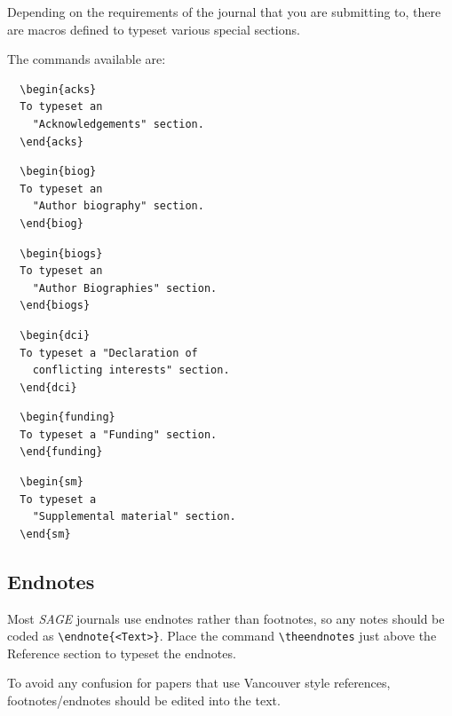 \documentclass[Afour,sageh,times]{includes/tex/sagej}
\begin{document}
Depending on the requirements of the journal that you are submitting to,
there are macros defined to typeset various special sections.

The commands available are:

\begin{verbatim}
  \begin{acks}
  To typeset an
    "Acknowledgements" section.
  \end{acks}
\end{verbatim}

\begin{verbatim}
  \begin{biog}
  To typeset an
    "Author biography" section.
  \end{biog}
\end{verbatim}

\begin{verbatim}
  \begin{biogs}
  To typeset an
    "Author Biographies" section.
  \end{biogs}
\end{verbatim}

\begin{verbatim}
  \begin{dci}
  To typeset a "Declaration of
    conflicting interests" section.
  \end{dci}
\end{verbatim}

\begin{verbatim}
  \begin{funding}
  To typeset a "Funding" section.
  \end{funding}
\end{verbatim}

\begin{verbatim}
  \begin{sm}
  To typeset a
    "Supplemental material" section.
  \end{sm}
\end{verbatim}

\subsection{Endnotes}

Most \textit{SAGE} journals use endnotes rather than footnotes, so any
notes should be coded as \verb+\endnote{<Text>}+. Place the command
\verb+\theendnotes+ just above the Reference section to typeset the
endnotes.

To avoid any confusion for papers that use Vancouver style references,
footnotes/endnotes should be edited into the text.
\end{document}
